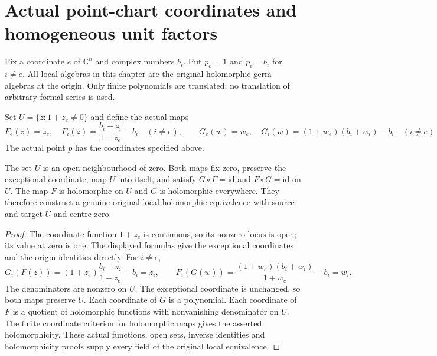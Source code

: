 \section{Actual point-chart coordinates and homogeneous unit factors}

Fix a coordinate $e$ of $\mathbb C^n$ and complex numbers $b_i$.
Put $p_e=1$ and $p_i=b_i$ for $i\ne e$. All local algebras in this
chapter are the original holomorphic germ algebras at the origin.
Only finite polynomials are translated; no translation of arbitrary
formal series is used.

\begin{definition}
\label{hir:actual-point-unit-coordinate-maps}
\leanok
Set $U=\{z:1+z_e\ne0\}$ and define the actual maps
\[
 F_e(z)=z_e,\quad F_i(z)=\frac{b_i+z_i}{1+z_e}-b_i\quad(i\ne e),
 \qquad
 G_e(w)=w_e,\quad G_i(w)=(1+w_e)(b_i+w_i)-b_i\quad(i\ne e).
\]
The actual point $p$ has the coordinates specified above.
\end{definition}

\begin{theorem}
\label{hir:actual-point-unit-local-biholomorphism}
\leanok
The set $U$ is an open neighbourhood of zero. Both maps fix zero,
preserve the exceptional coordinate, map $U$ into itself, and satisfy
$G\circ F=\mathrm{id}$ and $F\circ G=\mathrm{id}$ on $U$.
The map $F$ is holomorphic on $U$ and $G$ is holomorphic everywhere.
They therefore construct a genuine original local holomorphic equivalence
with source and target $U$ and centre zero.
\end{theorem}
\begin{proof}
The coordinate function $1+z_e$ is continuous, so its nonzero locus
is open; its value at zero is one. The displayed formulas give the
exceptional coordinates and the origin identities directly. For $i\ne e$,
\[
 G_i(F(z))=(1+z_e)\frac{b_i+z_i}{1+z_e}-b_i=z_i,
 \qquad
 F_i(G(w))=\frac{(1+w_e)(b_i+w_i)}{1+w_e}-b_i=w_i.
\]
The denominators are nonzero on $U$. The exceptional coordinate is
unchanged, so both maps preserve $U$. Each coordinate of $G$ is a
polynomial. Each coordinate of $F$ is a quotient of holomorphic
functions with nonvanishing denominator on $U$. The finite coordinate
criterion for holomorphic maps gives the asserted holomorphicity.
These actual functions, open sets, inverse identities and holomorphicity
proofs supply every field of the original local equivalence.
\end{proof}

